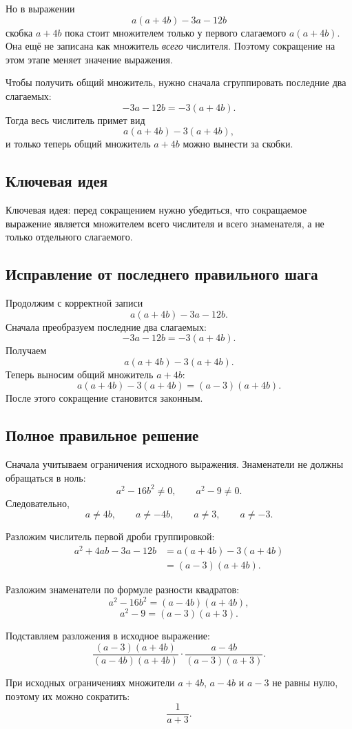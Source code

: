 \documentclass[12pt,a4paper]{article}
\newcommand{\keyidea}{\textcolor{blue!60!black}{Ключевая идея:}}
\begin{document}
Но в выражении
\[
a(a+4b)-3a-12b
\]
скобка $a+4b$ пока стоит множителем только у первого слагаемого $a(a+4b)$. Она ещё не записана как множитель \emph{всего} числителя. Поэтому сокращение на этом этапе меняет значение выражения.

Чтобы получить общий множитель, нужно сначала сгруппировать последние два слагаемых:
\[
-3a-12b=-3(a+4b).
\]
Тогда весь числитель примет вид
\[
a(a+4b)-3(a+4b),
\]
и только теперь общий множитель $a+4b$ можно вынести за скобки.

\subsection*{Ключевая идея}
\keyidea{} перед сокращением нужно убедиться, что сокращаемое выражение является множителем всего числителя и всего знаменателя, а не только отдельного слагаемого.

\subsection*{Исправление от последнего правильного шага}
Продолжим с корректной записи
\[
a(a+4b)-3a-12b.
\]
Сначала преобразуем последние два слагаемых:
\[
-3a-12b=-3(a+4b).
\]
Получаем
\[
a(a+4b)-3(a+4b).
\]
Теперь выносим общий множитель $a+4b$:
\[
a(a+4b)-3(a+4b)=(a-3)(a+4b).
\]
После этого сокращение становится законным.

\subsection*{Полное правильное решение}
Сначала учитываем ограничения исходного выражения. Знаменатели не должны обращаться в ноль:
\[
a^2-16b^2\ne 0,\qquad a^2-9\ne 0.
\]
Следовательно,
\[
a\ne 4b,\qquad a\ne -4b,\qquad a\ne 3,\qquad a\ne -3.
\]

Разложим числитель первой дроби группировкой:
\begin{align*}
a^2+4ab-3a-12b
&=a(a+4b)-3(a+4b)\\
&=(a-3)(a+4b).
\end{align*}

Разложим знаменатели по формуле разности квадратов:
\[
a^2-16b^2=(a-4b)(a+4b),
\]
\[
a^2-9=(a-3)(a+3).
\]

Подставляем разложения в исходное выражение:
\[
\frac{(a-3)(a+4b)}{(a-4b)(a+4b)}\cdot
\frac{a-4b}{(a-3)(a+3)}.
\]

При исходных ограничениях множители $a+4b$, $a-4b$ и $a-3$ не равны нулю, поэтому их можно сократить:
\[
\frac{1}{a+3}.
\]
\end{document}
